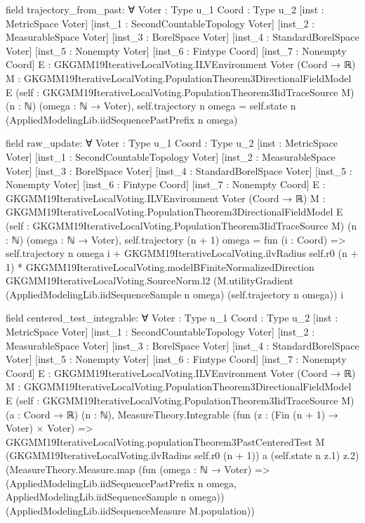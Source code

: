\documentclass[10pt]{article}
\begin{document}
\begin{ReviewVerbatim}
field trajectory_from_past:
∀ {Voter : Type u_1} {Coord : Type u_2} [inst : MetricSpace Voter] [inst_1 : SecondCountableTopology Voter]
  [inst_2 : MeasurableSpace Voter] [inst_3 : BorelSpace Voter] [inst_4 : StandardBorelSpace Voter]
  [inst_5 : Nonempty Voter] [inst_6 : Fintype Coord] [inst_7 : Nonempty Coord]
  {E : GKGMM19IterativeLocalVoting.ILVEnvironment Voter (Coord → ℝ)}
  {M : GKGMM19IterativeLocalVoting.PopulationTheorem3DirectionalFieldModel E}
  (self : GKGMM19IterativeLocalVoting.PopulationTheorem3IidTraceSource M) (n : ℕ) (omega : ℕ → Voter),
  self.trajectory n omega = self.state n (AppliedModelingLib.iidSequencePastPrefix n omega)

field raw_update:
∀ {Voter : Type u_1} {Coord : Type u_2} [inst : MetricSpace Voter] [inst_1 : SecondCountableTopology Voter]
  [inst_2 : MeasurableSpace Voter] [inst_3 : BorelSpace Voter] [inst_4 : StandardBorelSpace Voter]
  [inst_5 : Nonempty Voter] [inst_6 : Fintype Coord] [inst_7 : Nonempty Coord]
  {E : GKGMM19IterativeLocalVoting.ILVEnvironment Voter (Coord → ℝ)}
  {M : GKGMM19IterativeLocalVoting.PopulationTheorem3DirectionalFieldModel E}
  (self : GKGMM19IterativeLocalVoting.PopulationTheorem3IidTraceSource M) (n : ℕ) (omega : ℕ → Voter),
  self.trajectory (n + 1) omega = fun (i : Coord) =>
    self.trajectory n omega i +
      GKGMM19IterativeLocalVoting.ilvRadius self.r0 (n + 1) *
        GKGMM19IterativeLocalVoting.modelBFiniteNormalizedDirection GKGMM19IterativeLocalVoting.SourceNorm.l2
          (M.utilityGradient (AppliedModelingLib.iidSequenceSample n omega) (self.trajectory n omega)) i

field centered_test_integrable:
∀ {Voter : Type u_1} {Coord : Type u_2} [inst : MetricSpace Voter] [inst_1 : SecondCountableTopology Voter]
  [inst_2 : MeasurableSpace Voter] [inst_3 : BorelSpace Voter] [inst_4 : StandardBorelSpace Voter]
  [inst_5 : Nonempty Voter] [inst_6 : Fintype Coord] [inst_7 : Nonempty Coord]
  {E : GKGMM19IterativeLocalVoting.ILVEnvironment Voter (Coord → ℝ)}
  {M : GKGMM19IterativeLocalVoting.PopulationTheorem3DirectionalFieldModel E}
  (self : GKGMM19IterativeLocalVoting.PopulationTheorem3IidTraceSource M) (a : Coord → ℝ) (n : ℕ),
  MeasureTheory.Integrable
    (fun (z : (Fin (n + 1) → Voter) × Voter) =>
      GKGMM19IterativeLocalVoting.populationTheorem3PastCenteredTest M
        (GKGMM19IterativeLocalVoting.ilvRadius self.r0 (n + 1)) a (self.state n z.1) z.2)
    (MeasureTheory.Measure.map
      (fun (omega : ℕ → Voter) =>
        (AppliedModelingLib.iidSequencePastPrefix n omega, AppliedModelingLib.iidSequenceSample n omega))
      (AppliedModelingLib.iidSequenceMeasure M.population))


\end{ReviewVerbatim}
\end{document}

